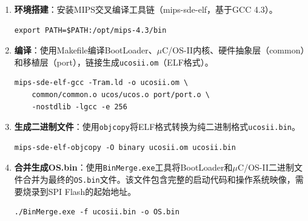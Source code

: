\begin{enumerate}[leftmargin=2em]
    \item \textbf{环境搭建}：安装MIPS交叉编译工具链（mips-sde-elf，基于GCC 4.3）。
    \begin{lstlisting}[style=c, caption={设置环境变量}]
export PATH=$PATH:/opt/mips-4.3/bin
    \end{lstlisting}

    \item \textbf{编译}：使用Makefile编译BootLoader、$\mu$C/OS-II内核、硬件抽象层（common）和移植层（port），链接生成\texttt{ucosii.om}（ELF格式）。
    \begin{lstlisting}[style=c, caption={编译链接命令}]
mips-sde-elf-gcc -Tram.ld -o ucosii.om \
    common/common.o ucos/ucos.o port/port.o \
    -nostdlib -lgcc -e 256
    \end{lstlisting}

    \item \textbf{生成二进制文件}：使用\texttt{objcopy}将ELF格式转换为纯二进制格式\texttt{ucosii.bin}。
    \begin{lstlisting}[style=c, caption={生成二进制文件}]
mips-sde-elf-objcopy -O binary ucosii.om ucosii.bin
    \end{lstlisting}

    \item \textbf{合并生成OS.bin}：使用\texttt{BinMerge.exe}工具将BootLoader和$\mu$C/OS-II二进制文件合并为最终的\texttt{OS.bin}文件。该文件包含完整的启动代码和操作系统映像，需要烧录到SPI Flash的起始地址。
    \begin{lstlisting}[style=c, caption={合并生成OS.bin}]
./BinMerge.exe -f ucosii.bin -o OS.bin
    \end{lstlisting}
\end{enumerate}
